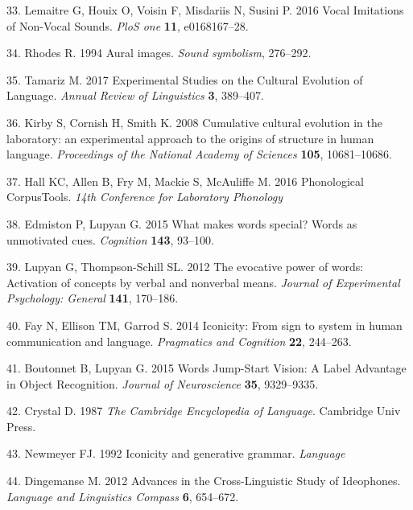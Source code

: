 \documentclass[english,floatsintext,man]{apa6}
\theoremstyle{definition}
\theoremstyle{definition}
\theoremstyle{definition}
\theoremstyle{remark}
\begin{document}
\leavevmode\hypertarget{ref-Lemaitre:2016kz}{}%
33. Lemaitre G, Houix O, Voisin F, Misdariis N, Susini P. 2016 Vocal
Imitations of Non-Vocal Sounds. \emph{PloS one} \textbf{11},
e0168167--28.

\leavevmode\hypertarget{ref-Rhodes:1994au}{}%
34. Rhodes R. 1994 Aural images. \emph{Sound symbolism}, 276--292.

\leavevmode\hypertarget{ref-Tamariz:2017bd}{}%
35. Tamariz M. 2017 Experimental Studies on the Cultural Evolution of
Language. \emph{Annual Review of Linguistics} \textbf{3}, 389--407.

\leavevmode\hypertarget{ref-Kirby:2008kja}{}%
36. Kirby S, Cornish H, Smith K. 2008 Cumulative cultural evolution in
the laboratory: an experimental approach to the origins of structure in
human language. \emph{Proceedings of the National Academy of Sciences}
\textbf{105}, 10681--10686.

\leavevmode\hypertarget{ref-PCT:1.1}{}%
37. Hall KC, Allen B, Fry M, Mackie S, McAuliffe M. 2016 Phonological
CorpusTools. \emph{14th Conference for Laboratory Phonology}

\leavevmode\hypertarget{ref-Edmiston:2015he}{}%
38. Edmiston P, Lupyan G. 2015 What makes words special? Words as
unmotivated cues. \emph{Cognition} \textbf{143}, 93--100.

\leavevmode\hypertarget{ref-Lupyan:2012cp}{}%
39. Lupyan G, Thompson-Schill SL. 2012 The evocative power of words:
Activation of concepts by verbal and nonverbal means. \emph{Journal of
Experimental Psychology: General} \textbf{141}, 170--186.

\leavevmode\hypertarget{ref-Fay:2014ih}{}%
40. Fay N, Ellison TM, Garrod S. 2014 Iconicity: From sign to system in
human communication and language. \emph{Pragmatics and Cognition}
\textbf{22}, 244--263.

\leavevmode\hypertarget{ref-Boutonnet:2015fz}{}%
41. Boutonnet B, Lupyan G. 2015 Words Jump-Start Vision: A Label
Advantage in Object Recognition. \emph{Journal of Neuroscience}
\textbf{35}, 9329--9335.

\leavevmode\hypertarget{ref-Crystal:1987en}{}%
42. Crystal D. 1987 \emph{The Cambridge Encyclopedia of Language}.
Cambridge Univ Press.

\leavevmode\hypertarget{ref-Newmeyer:1992we}{}%
43. Newmeyer FJ. 1992 Iconicity and generative grammar. \emph{Language}

\leavevmode\hypertarget{ref-Dingemanse:2012fc}{}%
44. Dingemanse M. 2012 Advances in the Cross-Linguistic Study of
Ideophones. \emph{Language and Linguistics Compass} \textbf{6},
654--672.
\end{document}
